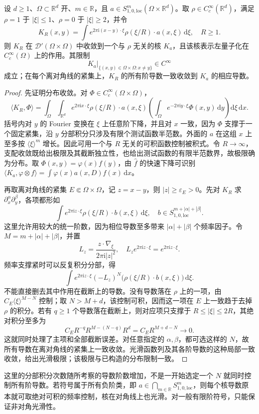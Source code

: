 \begin{proposition}[符号核的构造与非对角光滑性]
\label{b2:prop:G-off-diagonal-kernel}
设 \(d\ge1\)、\(\Omega\subset\mathbb R^d\) 开、\(m\in\mathbb R\)，且
\(a\in S^m_{1,0,\mathrm{loc}}(\Omega\times\mathbb R^d)\)。取
\(\rho\in C_c^\infty(\mathbb R^d)\)，满足 \(\rho=1\) 于 \(|\xi|\le1\)、\(\rho=0\) 于 \(|\xi|\ge2\)，并令
\[
 K_R(x,y)=\int e^{2\pi\mathrm i(x-y)\cdot\xi}
             \rho(\xi/R)\cdot a(x,\xi)\,\mathrm d\xi,
 \quad R\ge1.
\]
则 \(K_R\) 在 \(\mathcal D'(\Omega\times\Omega)\) 中收敛到一个与 \(\rho\) 无关的核 \(K_a\)，且该核表示左量子化在 \(C_c^\infty(\Omega)\) 上的作用。其限制
\[
 K_a\big|_{\{(x,y)\in\Omega\times\Omega:x\ne y\}}
 \in C^\infty
\]
成立；在每个离对角线的紧集上，\(K_R\) 的所有阶导数一致收敛到 \(K_a\) 的相应导数。
\end{proposition}
\begin{proof}
先证明分布收敛。对 \(\Phi\in C_c^\infty(\Omega\times\Omega)\)，
\[
 \langle K_R,\Phi\rangle
 =\int_\Omega\int_{\mathbb R^d}e^{2\pi\mathrm ix\cdot\xi}
       \rho(\xi/R)\cdot a(x,\xi)
       \left(\int_\Omega e^{-2\pi\mathrm iy\cdot\xi}
                     \Phi(x,y)\,\mathrm dy\right)\mathrm d\xi\,\mathrm dx.
\]
括号内对 \(y\) 的 Fourier 变换在 \(\xi\) 上任意阶下降，并且对 \(x\) 一致，因为 \(\Phi\) 支撑于一个固定紧集，沿 \(y\) 分部积分只涉及有限个测试函数半范数。外面的 \(a\) 在这组 \(x\) 上至多按 \(\langle\xi\rangle^m\) 增长。因此可用一个与 \(R\) 无关的可积函数控制被积式。令 \(R\to\infty\)，支配收敛既给出极限及其截断独立性，也给出测试函数的有限半范数界，故极限确为分布。取 \(\Phi(x,y)=\varphi(x)f(y)\)，由 \(\widehat f\) 的快速下降可识别
\(\langle K_a,\varphi\otimes f\rangle=\int\varphi(x)a(x,D)f(x)\,\mathrm dx\)。

再取离对角线的紧集 \(E\Subset\Omega\times\Omega\)，记 \(z=x-y\)，则 \(|z|\ge\varepsilon_E>0\)。先对 \(K_R\) 求 \(\partial_x^\alpha\partial_y^\beta\)，各项都形如
\[
 \int e^{2\pi\mathrm iz\cdot\xi}\rho(\xi/R)\cdot b(x,\xi)\,\mathrm d\xi,
 \quad b\in S^{m+|\alpha|+|\beta|}_{1,0,\mathrm{loc}}.
\]
这里允许用较大的统一阶数，因为相位导数至多带来 \(|\alpha|+|\beta|\) 个频率因子。令 \(M=m+|\alpha|+|\beta|\)，并置
\[
 L_z=\frac{z\cdot\nabla_\xi}{2\pi\mathrm i|z|^2},
 \quad L_z e^{2\pi\mathrm iz\cdot\xi}=e^{2\pi\mathrm iz\cdot\xi}.
\]
频率支撑紧时可以反复积分分部，得
\[
 \int e^{2\pi\mathrm iz\cdot\xi}
          (-L_z)^N\bigl(\rho(\xi/R)\cdot b(x,\xi)\bigr)\,\mathrm d\xi.
\]
不能直接删去其中作用在截断上的导数。没有导数落在 \(\rho\) 上的一项，由
\(C_E\langle\xi\rangle^{M-N}\) 控制；取 \(N>M+d\)，该控制可积，因而这一项在 \(E\) 上一致趋于去掉 \(\rho\) 的积分。若有 \(q\ge1\) 个导数落在截断上，则对应项只支撑于 \(R\le|\xi|\le2R\)，其绝对积分至多为
\[
 C_E R^{-q}R^{M-(N-q)}R^d
 =C_E R^{M+d-N}\longrightarrow0.
\]
这就同时处理了主项和全部截断误差。对任意指定的 \(\alpha,\beta\)，都可选这样的 \(N\)，故所有导数在离对角线的紧集上一致收敛。光滑函数列及其各阶导数的这种局部一致收敛，给出光滑极限；该极限与已构造的分布限制一致。
\end{proof}
这里的分部积分次数随所考察的导数阶数增加，不是一开始选定一个 \(N\) 就同时控制所有阶导数。若符号属于所有负阶类，即 \(a\in\bigcap_{m\in\mathbb R}S^m_{1,0,\mathrm{loc}}\)，则每个核导数原本就可取绝对可积的频率控制，核在对角线上也光滑。对一般有限阶符号，只能保证非对角光滑性。

